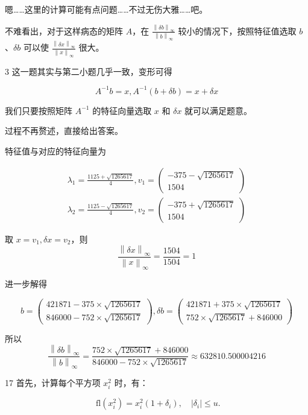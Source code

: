 嗯\ldots\ldots 这里的计算可能有点问题\ldots\ldots 不过无伤大雅\ldots\ldots 吧。

不难看出，对于这样病态的矩阵 \(A\)，在
\(\frac{\left\| {\delta b} \right\|_{\infty}}{\left\| b \right\|_{\infty}}\)
较小的情况下，按照特征值选取 \(b\)、\(\delta b\) 可以使
\(\frac{\left\| {\delta x} \right\|_{\infty}}{\left\| x \right\|_{\infty}}\)
很大。

3 这一题其实与第二小题几乎一致，变形可得

\[A^{- 1}b = x,A^{- 1}(b + \delta b) = x + \delta x\]

我们只要按照矩阵 \(A^{- 1}\) 的特征向量选取 \(x\) 和 \(\delta x\)
就可以满足题意。

过程不再赘述，直接给出答案。

特征值与对应的特征向量为

\[\begin{array}{r}
\lambda_{1} = \frac{1125 + \sqrt{1265617}}{4},v_{1} = \begin{pmatrix}
 - 375 - \sqrt{1265617} \\
1504
\end{pmatrix} \\
\lambda_{2} = \frac{1125 - \sqrt{1265617}}{4},v_{2} = \begin{pmatrix}
 - 375 + \sqrt{1265617} \\
1504
\end{pmatrix}
\end{array}\]

取 \(x = v_{1},\delta x = v_{2}\)，则
\[\frac{\left\| {\delta x} \right\|_{\infty}}{\left\| x \right\|_{\infty}} = \frac{1504}{1504} = 1\]

进一步解得

\[b = \begin{pmatrix}
421871 - 375 \times \sqrt{1265617} \\
846000 - 752 \times \sqrt{1265617}
\end{pmatrix},\delta b = \begin{pmatrix}
421871 + 375 \times \sqrt{1265617} \\
752 \times \sqrt{1265617} + 846000
\end{pmatrix}\]

所以
\[\frac{\left\| {\delta b} \right\|_{\infty}}{\left\| b \right\|_{\infty}} = \frac{752 \times \sqrt{1265617} + 846000}{846000 - 752 \times \sqrt{1265617}} \approx 632810.500004216\]

\textbf{ }17 首先，计算每个平方项 \(x_{i}^{2}\) 时，有：

\[\text{ fl}\left( x_{i}^{2} \right) = x_{i}^{2}\left( 1 + \delta_{i} \right),\quad|\delta_{i}| \leq u.\]

